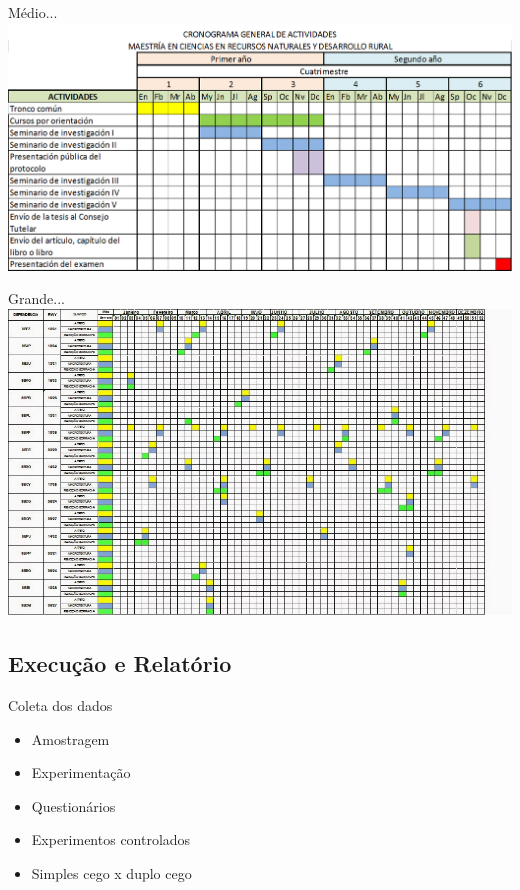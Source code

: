 \documentclass{beamer}
\begin{document}
\begin{frame}{Médio...}
  \includegraphics[width=\textwidth]{Etapas/cronograma-2}
\end{frame}

\begin{frame}{Grande...}
  \includegraphics[width=\textwidth]{Etapas/cronograma-3}
\end{frame}



\subsection{Execução e Relatório}

\begin{frame}{Coleta dos dados}
  \begin{itemize}
  \item Amostragem
  \item Experimentação
  \item Questionários
  \item Experimentos controlados
  \item Simples cego x duplo cego
  \end{itemize}
\end{frame}
\end{document}
